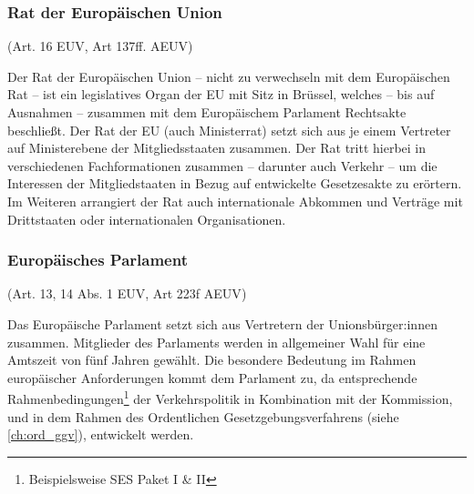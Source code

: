 \subsubsection{Rat der Europäischen Union}

\begin{center}
    {\footnotesize(Art. 16 \ac{EUV}, Art 137ff. \ac{AEUV})}
\end{center}

\noindent
Der Rat der Europäischen Union – nicht zu verwechseln mit dem Europäischen Rat – ist ein legislatives Organ der EU mit Sitz in Brüssel, welches -- bis auf Ausnahmen -- zusammen mit dem Europäischem Parlament Rechtsakte beschließt.
Der Rat der EU (auch Ministerrat) setzt sich aus je einem Vertreter auf Ministerebene der Mitgliedsstaaten zusammen. 
Der Rat tritt hierbei in verschiedenen Fachformationen zusammen -- darunter auch Verkehr -- um die Interessen der Mitgliedstaaten in Bezug auf entwickelte Gesetzesakte zu erörtern.
Im Weiteren arrangiert der Rat auch internationale Abkommen und Verträge mit Drittstaaten oder internationalen Organisationen.


\subsubsection{Europäisches Parlament}

\begin{center}
    {\footnotesize(Art. 13, 14 Abs. 1 \ac{EUV}, Art 223f \ac{AEUV})}
\end{center}

\noindent
Das Europäische Parlament setzt sich aus Vertretern der Unionsbürger:innen zusammen.
Mitglieder des Parlaments werden in allgemeiner Wahl für eine Amtszeit von fünf Jahren gewählt.
Die besondere Bedeutung im Rahmen europäischer Anforderungen kommt dem Parlament zu, da entsprechende Rahmenbedingungen\footnote{Beispielsweise \ac{SES} Paket I \& II} der Verkehrspolitik in Kombination mit der Kommission, und in dem Rahmen des Ordentlichen Gesetzgebungsverfahrens (siehe \ref{ch:ord_ggv}), entwickelt werden.


